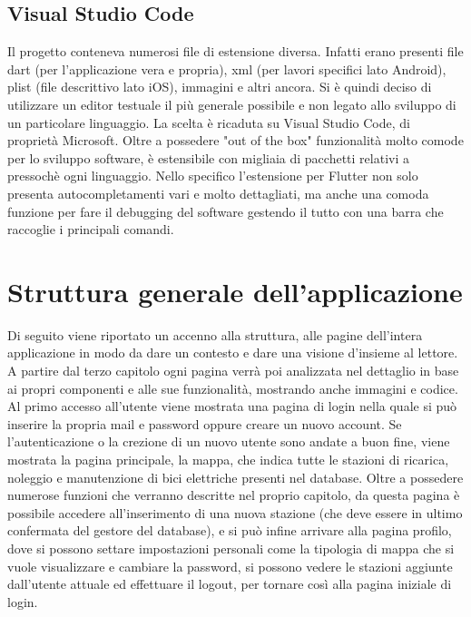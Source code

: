 	\subsection{Visual Studio Code}
	Il progetto conteneva numerosi file di estensione diversa. Infatti erano
	presenti file dart (per l'applicazione vera e propria), xml (per lavori
	specifici lato Android), plist (file descrittivo lato iOS), immagini e altri
	ancora. Si è quindi deciso di utilizzare un editor testuale il più generale
	possibile e non legato allo sviluppo di un particolare linguaggio. La
	scelta è ricaduta su Visual Studio Code, di proprietà Microsoft. Oltre a
	possedere "out of the box" funzionalità molto comode per lo sviluppo
	software, è estensibile con migliaia di pacchetti relativi a pressochè ogni
	linguaggio. Nello specifico l'estensione per Flutter non solo presenta
	autocompletamenti vari e molto dettagliati, ma anche una comoda funzione per
	fare il debugging del software gestendo il tutto con una barra che raccoglie i
	principali comandi. 

	\section{Struttura generale dell'applicazione}
	Di seguito viene riportato un accenno alla struttura, alle pagine
	dell'intera applicazione in modo da dare un contesto e dare una visione
	d'insieme al lettore. A partire dal terzo capitolo ogni pagina verrà poi
	analizzata nel dettaglio in base ai propri componenti e alle sue
	funzionalità, mostrando anche immagini e codice. \newline
	Al primo accesso all'utente viene mostrata una pagina di login nella quale
	si può inserire la propria mail e password oppure creare un nuovo account.
	Se l'autenticazione o la crezione di un nuovo utente sono andate a buon
	fine, viene mostrata la pagina principale, la mappa, che indica tutte le
	stazioni di ricarica, noleggio e manutenzione di bici elettriche presenti
	nel database. Oltre a possedere numerose funzioni che verranno descritte nel
	proprio capitolo, da questa pagina è possibile accedere all'inserimento di
	una nuova stazione (che deve essere in ultimo confermata del gestore del
	database), e si può infine arrivare alla pagina profilo, dove si possono
	settare impostazioni personali come la tipologia di mappa che si vuole
	visualizzare e cambiare la password, si possono vedere le stazioni aggiunte
	dall'utente attuale ed effettuare il logout, per tornare così alla pagina
	iniziale di login. 	
	
%